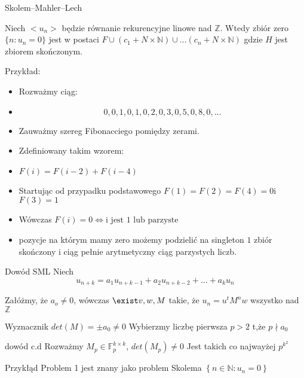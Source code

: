 \documentclass{beamer}
\theoremstyle{definition}
\begin{document}
\begin{frame}{Skolem–Mahler–Lech }
\begin{theorem}
    Niech $<u_n>$ będzie równanie rekurencyjne linowe nad $\mathbb{Z}$. Wtedy zbiór zero $\{ n: u_n =0\}$ jest w postaci $F \cup (c_1 + N\times \mathbb{N}) \cup \ldots (c_n + N\times \mathbb{N}) $ gdzie $H$ jest zbiorem skończonym.  
\end{theorem}
\end{frame}

\begin{frame}{Przykład:}
\begin{itemize}
   \item  Rozważmy ciąg: 
   \item  $$ 0, 0, 1, 0, 1, 0, 2, 0, 3, 0, 5, 0, 8, 0, ...$$
    \item      Zauważmy szereg Fibonacciego pomiędzy zerami. 
    \item  Zdefiniowany takim wzorem:
    \item  $F(i) = F(i-2) + F(i-4)$
    \item  Startując od przypadku podstawowego $F(1) = F(2) = F(4) = 0$i $F(3) = 1$
    \item  Wówczas $F(i) = 0 \iff \text{i jest 1 lub parzyste} $  
    \item pozycje na którym mamy zero możemy podzielić na singleton ${1}$ zbiór skończony i ciąg pełnie arytmetyczny ciąg parzystych liczb. 
\end{itemize}
\end{frame}

\begin{frame}{Dowód  SML}
    Niech $$u_{n+k}=a_{1} u_{n+k-1}+a_{2} u_{n+k-2}+\ldots+a_{k} u_{n}$$
    
    Załóżmy, że $a_o \neq 0$, wówczas $\exist v, w, M$ takie, że 
    $u_n = u^{t} M^{n} w $ wszystko nad $\mathbb{Z}$
    
    Wyznacznik $det(M) = \pm a_0 \neq 0$
    Wybierzmy liczbę pierwsza $p > 2$ t,że $p \nmid a_0$
\end{frame}

\begin{frame}{dowód c.d}
    Rozważmy $M_p \in \mathbb{F}_p^{k\times k} $, $det(M_p) \neq 0$
    Jest takich co najwayżej $p^{k^{2}}$
\end{frame}

\begin{frame}{Przykłąd}
Problem 1 jest znany jako problem Skolema 
    $\left\{n \in \mathbb{N}: u_{n}=0\right\}$
\end{frame}
    
\end{document}
